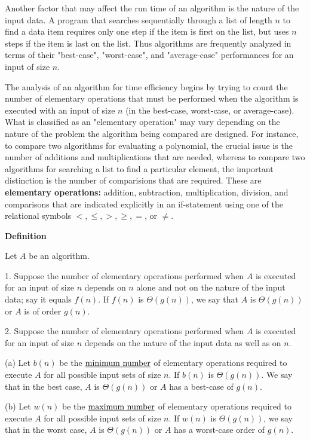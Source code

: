 \vskip 1mm
Another factor that may affect the run time of an algorithm is the nature of the input data. A program that searches sequentially through a list of length $n$ to find a data item requires only one step if the item is first on the list, but uses $n$ steps if the item is last on the list. Thus algorithms are  frequently analyzed in terms of their "best-case", "worst-case", and "average-case" performances for an input of size $n$.

\vskip 1mm
The analysis of an algorithm for time efficiency begins by trying to count the number of elementary operations that must be performed when the algorithm is executed with an input of size $n$ (in the best-case, worst-case, or average-case). What is classified as an "elementary operation" may vary depending on the nature of the problem the algorithm being compared are designed. For instance, to compare two algorithms for evaluating a polynomial, the crucial issue is the number of additions and multiplications that are needed, whereas to compare two algorithms for searching a list to find a particular element, the important distinction is the number of comparisions that are required. These are {\bf elementary operations:} addition, subtraction, multiplication, division, and comparisons that are indicated explicitly in an if-statement using one of the relational symbols $<,\leq,>,\geq,=$, or $\neq$.

\vskip 3mm
{\bf Definition}

\vskip 1mm
Let $A$ be an algorithm.

\vskip 3mm
1. Suppose the number of elementary operations performed when $A$ is executed for an input of size $n$ depends on $n$ alone and not on the nature of the input data; say it equals $f(n)$. If $f(n)$ is $\Theta(g(n))$, we say that $A$ is $\Theta(g(n))$ or $A$ is of order $g(n)$.

\vskip 3mm
2. Suppose the number of elementary operations performed when $A$ is executed for an input of size $n$ depends on the nature of the input data as well as on $n$.

\vskip 2mm
\qquad(a) Let $b(n)$ be the $\underline{\hbox{minimum number}}$ of elementary operations required to execute $A$ for all possible input sets of size $n$. If $b(n)$ is $\Theta(g(n))$. We say that in the best case, $A$ is $\Theta(g(n))$ or $A$ has a best-case of $g(n)$.

\vskip 2mm
\qquad(b) Let $w(n)$ be the $\underline{\hbox{maximum number}}$ of elementary operations required to execute $A$ for all possible input sets of size $n$. If $w(n)$ is $\Theta(g(n))$, we say that in the worst case, $A$ is $\Theta(g(n))$ or $A$ has a worst-case order of $g(n)$.

